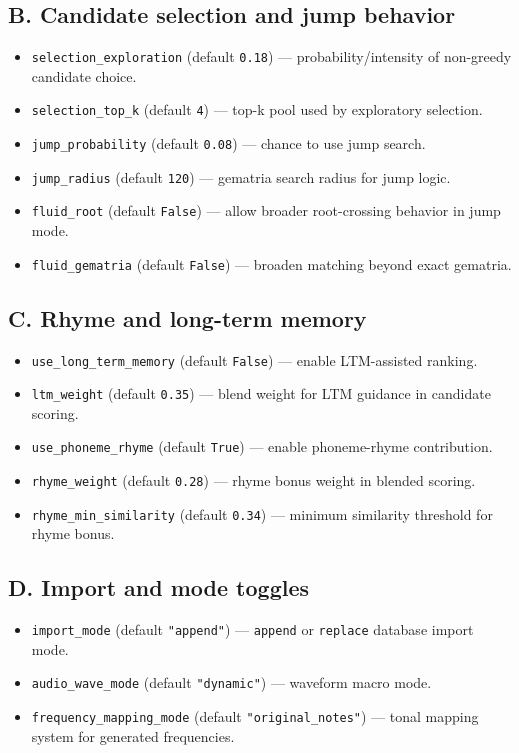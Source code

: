 \documentclass[11pt,a4paper]{article}
\begin{document}
\subsection*{B. Candidate selection and jump behavior}
\begin{itemize}
  \item \texttt{selection\_exploration} (default \texttt{0.18}) --- probability/intensity of non-greedy candidate choice.
  \item \texttt{selection\_top\_k} (default \texttt{4}) --- top-k pool used by exploratory selection.
  \item \texttt{jump\_probability} (default \texttt{0.08}) --- chance to use jump search.
  \item \texttt{jump\_radius} (default \texttt{120}) --- gematria search radius for jump logic.
  \item \texttt{fluid\_root} (default \texttt{False}) --- allow broader root-crossing behavior in jump mode.
  \item \texttt{fluid\_gematria} (default \texttt{False}) --- broaden matching beyond exact gematria.
\end{itemize}

\subsection*{C. Rhyme and long-term memory}
\begin{itemize}
  \item \texttt{use\_long\_term\_memory} (default \texttt{False}) --- enable LTM-assisted ranking.
  \item \texttt{ltm\_weight} (default \texttt{0.35}) --- blend weight for LTM guidance in candidate scoring.
  \item \texttt{use\_phoneme\_rhyme} (default \texttt{True}) --- enable phoneme-rhyme contribution.
  \item \texttt{rhyme\_weight} (default \texttt{0.28}) --- rhyme bonus weight in blended scoring.
  \item \texttt{rhyme\_min\_similarity} (default \texttt{0.34}) --- minimum similarity threshold for rhyme bonus.
\end{itemize}

\subsection*{D. Import and mode toggles}
\begin{itemize}
  \item \texttt{import\_mode} (default \texttt{"append"}) --- \texttt{append} or \texttt{replace} database import mode.
  \item \texttt{audio\_wave\_mode} (default \texttt{"dynamic"}) --- waveform macro mode.
  \item \texttt{frequency\_mapping\_mode} (default \texttt{"original\_notes"}) --- tonal mapping system for generated frequencies.
\end{itemize}
\end{document}
